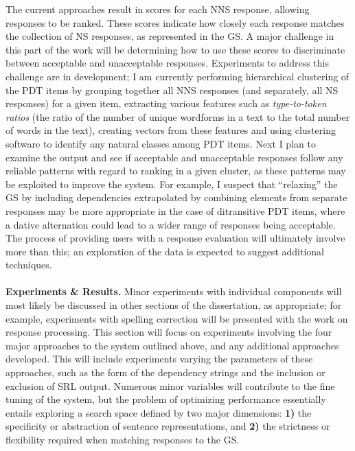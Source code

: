 \documentclass[11pt]{article}
\begin{document}
The current approaches result in scores for each NNS response, allowing responses to be ranked. These scores indicate how closely each response matches the collection of NS responses, as represented in the GS. A major challenge in this part of the work will be determining how to use these scores to discriminate between acceptable and unacceptable responses. Experiments to address this challenge are in development; I am currently performing hierarchical clustering of the PDT items by grouping together all NNS responses (and separately, all NS responses) for a given item, extracting various features such as \textit{type-to-token ratios} (the ratio of the number of unique wordforms in a text to the total number of words in the text), creating vectors from these features and using clustering software to identify any natural classes among PDT items. Next I plan to examine the output and see if acceptable and unacceptable responses follow any reliable patterns with regard to ranking in a given cluster, as these patterns may be exploited to improve the system. For example, I suspect that ``relaxing'' the GS by including dependencies extrapolated by combining elements from separate responses may be more appropriate in the case of ditransitive PDT items, where a dative alternation could lead to a wider range of responses being acceptable. The process of providing users with a response evaluation will ultimately involve more than this; an exploration of the data is expected to suggest additional techniques. \\
\\
\textbf{Experiments \& Results.} %
Minor experiments with individual components will most likely be discussed in other sections of the dissertation, as appropriate; for example, experiments with spelling correction will be presented with the work on response processing. This section will focus on experiments involving the four major approaches to the system outlined above, and any additional approaches developed. This will include experiments varying the parameters of these approaches, such as the form of the dependency strings and the inclusion or exclusion of SRL output. Numerous minor variables will contribute to the fine tuning of the system, but the problem of optimizing performance essentially entails exploring a search space defined by two major dimensions: \textbf{1)} the specificity or abstraction of sentence representations, and \textbf{2)} the strictness or flexibility required when matching responses to the GS.
\end{document}

